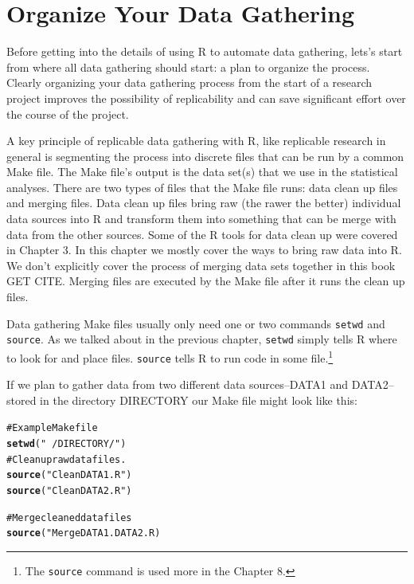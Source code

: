 \documentclass[ChapterTOCs,krantz1]{krantz}\usepackage{graphicx, color}
\makeatletter
\newcommand{\hlfunctioncall}[1]{\textcolor[rgb]{0.501960784313725,0,0.329411764705882}{\textbf{#1}}}%
\newcommand{\hlstring}[1]{\textcolor[rgb]{0.6,0.6,1}{#1}}%
\newcommand{\hlcomment}[1]{\textcolor[rgb]{0.180392156862745,0.6,0.341176470588235}{#1}}%
\newenvironment{kframe}{%
 \def\at@end@of@kframe{}%
 \ifinner\ifhmode%
  \def\at@end@of@kframe{\end{minipage}}%
  \begin{minipage}{\columnwidth}%
 \fi\fi%
 \def\FrameCommand##1{\hskip\@totalleftmargin \hskip-\fboxsep
 \colorbox{shadecolor}{##1}\hskip-\fboxsep
     \hskip-\linewidth \hskip-\@totalleftmargin \hskip\columnwidth}%
 \MakeFramed {\advance\hsize-\width
   \@totalleftmargin\z@ \linewidth\hsize
   \@setminipage}}%
 {\par\unskip\endMakeFramed%
 \at@end@of@kframe}
\newenvironment{knitrout}{}{} %
\makeatother
\begin{document}
\section{Organize Your Data Gathering}

Before getting into the details of using R to automate data gathering, lets's start from where all data gathering should start: a plan to organize the process. Clearly organizing your data gathering process from the start of a research project improves the possibility of replicability and can save significant effort over the course of the project. 

A key principle of replicable data gathering with R, like replicable research in general is segmenting the process into discrete files that can be run by a common Make file. The Make file's output is the data set(s) that we use in the statistical analyses. There are two types of files that the Make file runs: data clean up files and merging files. Data clean up files bring raw (the rawer the better) individual data sources into R and transform them into something that can be merge with data from the other sources. Some of the R tools for data clean up were covered in Chapter 3. In this chapter we mostly cover the ways to bring raw data into R. We don't explicitly cover the process of merging data sets together in this book GET CITE. Merging files are executed by the Make file after it runs the clean up files.

Data gathering Make files usually only need one or two commands {\tt{setwd}} and {\tt{source}}. As we talked about in the previous chapter, {\tt{setwd}} simply tells R where to look for and place files. {\tt{source}} tells R to run code in some file.\footnote{The {\tt{source}} command is used more in the Chapter 8.} 

If we plan to gather data from two different data sources--DATA1 and DATA2--stored in the directory DIRECTORY our Make file might look like this:

\begin{knitrout}
\color{fgcolor}\begin{kframe}
\begin{alltt}
\hlcomment{# Example Make file}
\hlfunctioncall{setwd}(\hlstring{"~/DIRECTORY/"})
\hlcomment{# Clean up raw data files.}
\hlfunctioncall{source}(\hlstring{"CleanDATA1.R"})
\hlfunctioncall{source}(\hlstring{"CleanDATA2.R"})
    
\hlcomment{# Merge cleaned data files}
\hlfunctioncall{source}("MergeDATA1.DATA2.R)
\end{alltt}
\end{kframe}
\end{knitrout}
\end{document}
